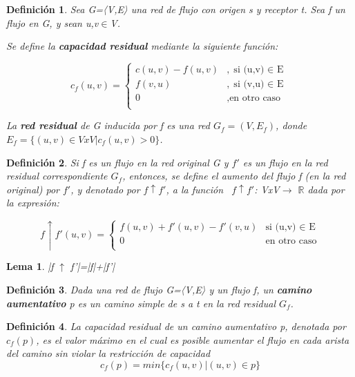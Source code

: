 \documentclass[10pt]{article} %
\newtheorem{mydef}{Definici\'on}%
\newtheorem{lem}{Lema}
\begin{document}
	\begin{mydef}
		Sea G=〈V,E〉 una red de flujo con origen s y receptor t. Sea f un flujo en G, y sean u,v$\in$V.
		
		Se define la \textbf{capacidad residual} mediante la siguiente función:
		
		\begin{equation}
			c_f(u,v) = 	\left\{		
			\begin{array}{lr}				
				c(u,v) -f(u,v) & , \text{si (u,v) $\in$ E}\\
				f(v,u) &, \text{si (v,u) $\in$ E}\\
				0 &,\text{en otro caso}\\
			\end{array}
		\right.
		\end{equation}
	
	La \textbf{red residual} de G inducida por f es una red $G_f=(V,E_f)$, donde 
	$E_f= \{ (u,v) \in VxV | c_f(u,v)>0 \}$.
	\end{mydef}

	\begin{mydef}
		
		Si f es un flujo en la red original G y $f'$ es un flujo en la red residual correspondiente $G_f$, entonces, se define el aumento del flujo f (en la  red  original) por $f'$, y denotado por $f\uparrow f'$, a la función  $f\uparrow f'$: VxV$\rightarrow$ $\mathbb{R}$ dada por la expresión:
		
		\begin{equation}
			f\uparrow f'(u,v) = \left\{ \begin{array}{lr}
				f(u,v) + f'(u,v) - f'(v,u) & \text{si (u,v) $\in$ E}\\
				0 & \text{en otro caso}\\
			\end{array}
		\right.
		\end{equation}
		
	\end{mydef}
	
	\begin{lem}
		|f $\uparrow$ f'|=|f|+|f'|
	\end{lem}
	
	\begin{mydef}
		Dada una red de flujo G=〈V,E〉 y un flujo f, un \textbf{camino aumentativo} p es un camino simple de s a t en la red residual $G_f$.
	\end{mydef}

	\begin{mydef}
		La capacidad residual de un camino aumentativo p, denotada por $c_f(p)$, es el valor máximo en el cual es posible aumentar el flujo en cada arista del camino sin violar la restricción de capacidad
		\begin{equation}
			c_f(p) = min\{c_f(u,v) | (u,v) \in p \}
		\end{equation}
	\end{mydef}
\end{document}
